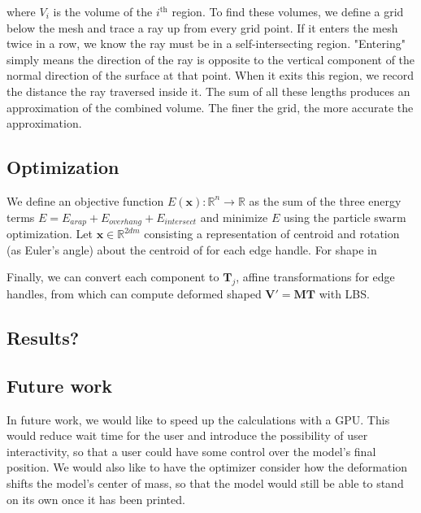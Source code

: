 \documentclass[12pt]{article}
\newcommand{\R}{\mathbb{R}}
\newcommand{\bV}{\mathbf{V}}
\newcommand{\bM}{\mathbf{M}}
\newcommand{\bT}{\mathbf{T}}
\newcommand{\bx}{\mathbf{x}}
\begin{document}
\begin{multicols}{2}
where $V_i$ is the volume of the $i^{\text{th}}$ region. To find these volumes, we define a grid below the mesh and trace a ray up from every grid point. If it enters the mesh twice in a row, we know the ray must be in a self-intersecting region. "Entering" simply means the direction of the ray is opposite to the vertical component of the normal direction of the surface at that point. When it exits this region, we record the distance the ray traversed inside it. The sum of all these lengths produces an approximation of the combined volume. The finer the grid, the more accurate the approximation.


\subsection*{Optimization}

We define an objective function $E(\bx): \R^n \rightarrow \R$ as the sum of the three energy terms $E = E_{arap} + E_{overhang} + E_{intersect}$
and minimize $E$ using the particle swarm optimization. Let $\bx \in \R^{2dm}$ consisting a representation of centroid and rotation (as Euler's angle) about the centroid of for each edge handle. For shape in 

Finally, we can convert each component to $\bT_j$, affine transformations for edge handles, from which can compute deformed shaped $\bV' = \bM \bT$ with LBS.

\subsection*{Results?}

\subsection*{Future work}
In future work, we would like to speed up the calculations with a GPU. This would reduce wait time for the user and introduce the possibility of user interactivity, so that a user could have some control over the model's final position. We would also like to have the optimizer consider how the deformation shifts the model's center of mass, so that the model would still be able to stand on its own once it has been printed.


\end{multicols} 
\end{document}
